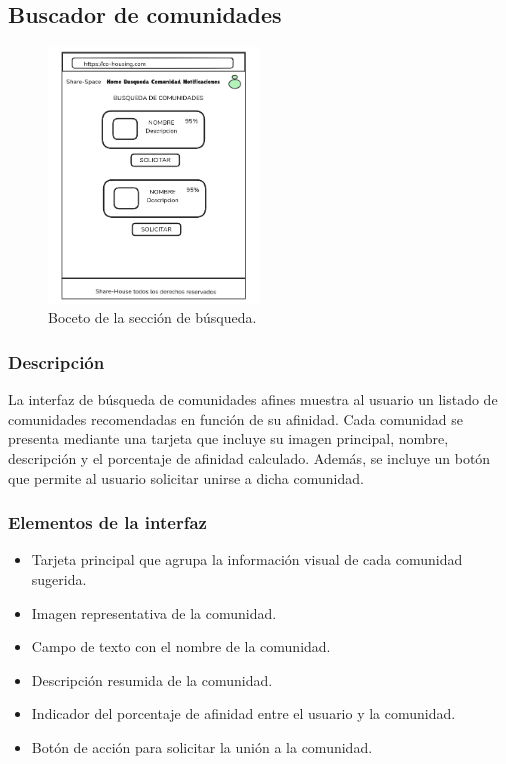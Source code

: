 \subsection{Buscador de comunidades}
\begin{figure}[H]
    \centering
    \includegraphics[width=0.5\textwidth]{fotos/Busqueda-boceto.png}
    \caption{Boceto de la sección de búsqueda.}
    \label{fig:busqueda}
\end{figure}

\subsubsection{Descripción}
La interfaz de búsqueda de comunidades afines muestra al usuario un listado de comunidades recomendadas en función de su afinidad. Cada comunidad se presenta mediante una tarjeta que incluye su imagen principal, nombre, descripción y el porcentaje de afinidad calculado. Además, se incluye un botón que permite al usuario solicitar unirse a dicha comunidad.

\subsubsection{Elementos de la interfaz}
\begin{itemize}
  \item Tarjeta principal que agrupa la información visual de cada comunidad sugerida.
  \item Imagen representativa de la comunidad.
  \item Campo de texto con el nombre de la comunidad.
  \item Descripción resumida de la comunidad.
  \item Indicador del porcentaje de afinidad entre el usuario y la comunidad.
  \item Botón de acción para solicitar la unión a la comunidad.
\end{itemize}

